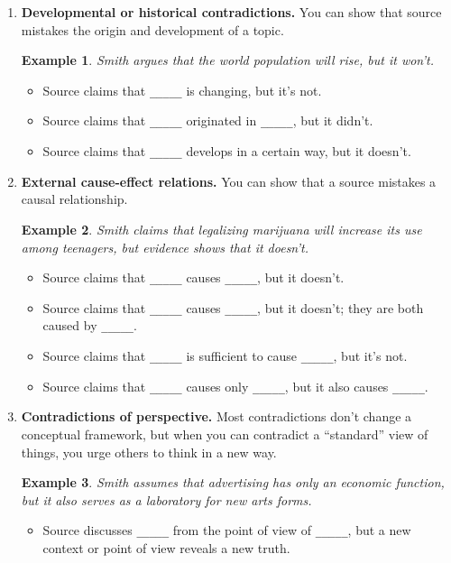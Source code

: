 \documentclass[oneside]{book}
\numberwithin{equation}{section}
\newtheorem{example}{Example}[section]
\begin{document}
\begin{enumerate}
\begin{itemize}
        \item Source claims that 1 part of \verb|_____| relates to another in a certain way, but it doesn't.
        \item Source claims that every \verb|_____| has \verb|_____| as 1 of its parts, but it doesn't.
    \end{itemize}
    \item \textbf{Developmental or historical contradictions.} You can show that source mistakes the origin and development of a topic.
    \begin{example}
        Smith argues that the world population will rise, but it won't.
    \end{example}
    \begin{itemize}
        \item Source claims that \verb|_____| is changing, but it's not.
        \item Source claims that \verb|_____| originated in \verb|_____|, but it didn't.
        \item Source claims that \verb|_____| develops in a certain way, but it doesn't.
    \end{itemize}
    \item \textbf{External cause-effect relations.} You can show that a source mistakes a causal relationship.
    \begin{example}
        Smith claims that legalizing marijuana will increase its use among teenagers, but evidence shows that it doesn't.
    \end{example}
    \begin{itemize}
        \item Source claims that \verb|_____| causes \verb|_____|, but it doesn't.
        \item Source claims that \verb|_____| causes \verb|_____|, but it doesn't; they are both caused by \verb|_____|.
        \item Source claims that \verb|_____| is sufficient to cause \verb|_____|, but it's not.
        \item Source claims that \verb|_____| causes only \verb|_____|, but it also causes \verb|_____|.
    \end{itemize}
    \item \textbf{Contradictions of perspective.} Most contradictions don't change a conceptual framework, but when you can contradict a ``standard'' view of things, you urge others to think in a new way.
    \begin{example}
        Smith assumes that advertising has only an economic function, but it also serves as a laboratory for new arts forms.
    \end{example}
    \begin{itemize}
        \item Source discusses \verb|_____| from the point of view of \verb|_____|, but a new context or point of view reveals a new truth.
        

\end{itemize}
\end{enumerate}
\end{document}

